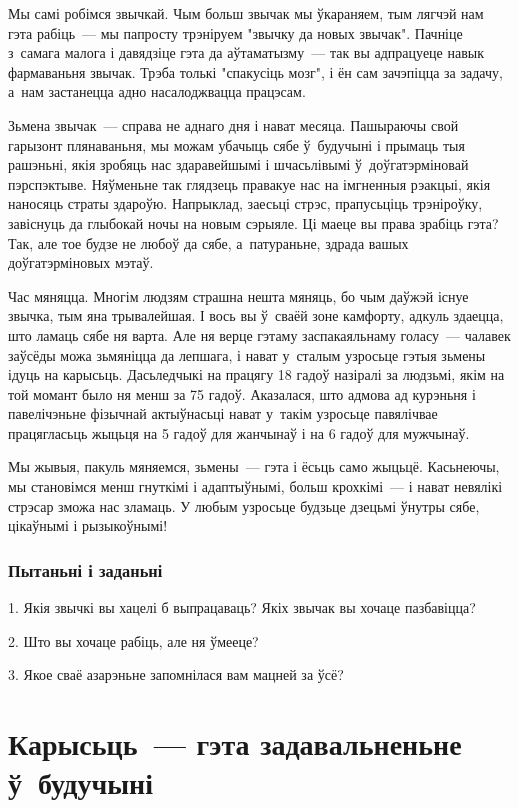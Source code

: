 Мы самі робімся звычкай. Чым больш звычак мы ўкараняем, тым лягчэй нам гэта рабіць~--- мы папросту трэніруем "звычку да новых звычак". Пачніце з~самага малога і давядзіце гэта да аўтаматызму~--- так вы адпрацуеце навык фармаваньня звычак. Трэба толькі "спакусіць мозг", і ён сам зачэпіцца за задачу, а~нам застанецца адно насалоджвацца працэсам.

Зьмена звычак~--- справа не аднаго дня і нават месяца. Пашыраючы свой гарызонт плянаваньня, мы можам убачыць сябе ў~будучыні і прымаць тыя рашэньні, якія зробяць нас здаравейшымі і шчасьлівымі ў~доўгатэрміновай пэрспэктыве. Няўменьне так глядзець правакуе нас на імгненныя рэакцыі, якія наносяць страты здароўю. Напрыклад, заесьці стрэс, прапусьціць трэніроўку, завіснуць да глыбокай ночы на новым сэрыяле. Ці маеце вы права зрабіць гэта? Так, але тое будзе не любоў да сябе, а~патураньне, здрада вашых доўгатэрміновых мэтаў.

Час мяняцца. Многім людзям страшна нешта мяняць, бо чым даўжэй існуе звычка, тым яна трывалейшая. І вось вы ў~сваёй зоне камфорту, адкуль здаецца, што ламаць сябе ня варта. Але ня верце гэтаму заспакаяльнаму голасу~--- чалавек заўсёды можа зьмяніцца да лепшага, і нават у~сталым узросьце гэтыя зьмены ідуць на карысьць. Дасьледчыкі на працягу 18 гадоў назіралі за людзьмі, якім на той момант было ня менш за 75 гадоў. Аказалася, што адмова ад курэньня і павелічэньне фізычнай актыўнасьці нават у~такім узросьце павялічвае працягласьць жыцьця на 5 гадоў для жанчынаў і на 6 гадоў для мужчынаў.

Мы жывыя, пакуль мяняемся, зьмены~--- гэта і ёсьць само жыцьцё. Касьнеючы, мы становімся менш гнуткімі і адаптыўнымі, больш крохкімі~--- і нават невялікі стрэсар зможа нас зламаць. У любым узросьце будзьце дзецьмі ўнутры сябе, цікаўнымі і рызыкоўнымі!

\subsubsection{Пытаньні і заданьні}

1. Якія звычкі вы хацелі б выпрацаваць? Якіх звычак вы хочаце пазбавіцца?

2. Што вы хочаце рабіць, але ня ўмееце?

3. Якое сваё азарэньне запомнілася вам мацней за ўсё?


\section{Карысьць~--- гэта задавальненьне ў~будучыні}

